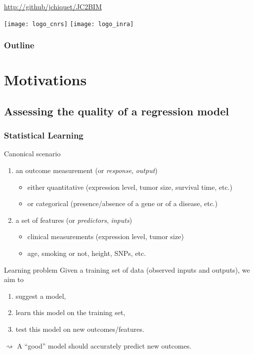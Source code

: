 \documentclass[10pt, c, xcolor=x11names]{beamer}\usepackage[]{graphicx}\usepackage[]{color}
\title{\currentCourse}
\subtitle{\huge\currentChapter\normalsize}
\institute{\currentInstitute}
\date{\currentDate}
\newcommand{\dotitlepage}{%
  \begin{frame}
    \titlepage
    \vfill
    \begin{center}
        \scriptsize\url{http://github/jchiquet/JC2BIM}
    \end{center}
    \vfill
    \texttt{[image: logo\_cnrs]}\hfill
    \texttt{[image: logo\_inra]}
  \end{frame}
}
\newcommand{\dotoc}{%
  \begin{frame}
    \frametitle{Outline}
    \tableofcontents[currentsection,
    sectionstyle=show/show,
    subsectionstyle=hide]
  \end{frame}
}
\begin{document}
\dotitlepage

\dotoc

\section{Motivations}


\subsection{Assessing the quality of a regression model}

\begin{frame}
  \frametitle{Statistical Learning}

  \begin{block}{Canonical scenario}
    \begin{enumerate}
    \item an \alert{outcome} measurement (or \emph{response}, \emph{output})
      \begin{itemize}
      \item  either   quantitative  (expression  level,   tumor  size,
        survival time, etc.)
      \item or categorical (presence/absence of a gene or of a disease, etc.)
      \end{itemize}
    \item a set of  \alert{features} (or \emph{predictors}, \emph{inputs})
      \begin{itemize}
      \item clinical measurements (expression level, tumor size)
      \item age, smoking or not, height, SNPs, etc.
      \end{itemize}
    \end{enumerate}
  \end{block}

  \vfill

  \begin{block}{Learning problem} Given a training set of data (observed
    inputs and outputs), we aim to
    \begin{enumerate}
    \item suggest a model,
    \item learn this model on the training set,
    \item test this model on new outcomes/features.
    \end{enumerate}
  \end{block}

  \vfill

  $\rightsquigarrow$   \alert{A  ``good''   model  should   accurately
    predict new outcomes.}
\end{frame}
\end{document}
